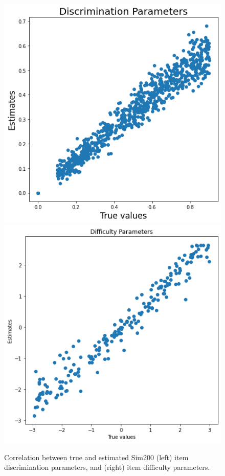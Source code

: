 \begin{figure}[h]
  \centering
  \includegraphics[width=.85\textwidth]{img/kt_irt/disc_est_attn2.png}
  \endminipage
  \includegraphics[width=.85\textwidth]{img/kt_irt/diff_attn_sim200.png}
  \endminipage
  \caption{Correlation between true and estimated Sim200 (left) item discrimination parameters, and (right) item difficulty parameters.}
  \label{fig:disc_diff_sim200}
\end{figure}

